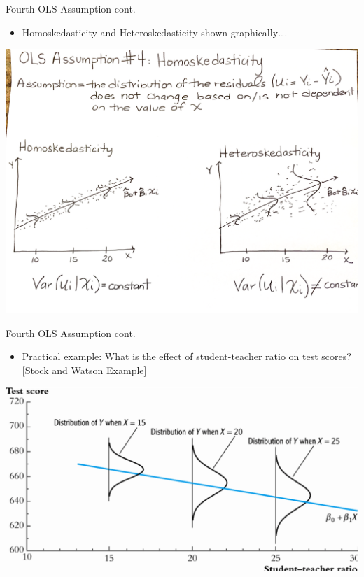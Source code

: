 \documentclass[8pt,ignorenonframetext,dvipsnames]{beamer}
\providecommand{\tightlist}{%
  \setlength{\itemsep}{0pt}\setlength{\parskip}{0pt}}
\let\olditem\item
\renewcommand{\item}{%
  \olditem\vspace{4pt}
}
\begin{document}
\begin{frame}{Fourth OLS Assumption cont.}
\protect\hypertarget{fourth-ols-assumption-cont.}{}

\begin{itemize}
\tightlist
\item
  Homoskedasticity and Heteroskedasticity shown graphically\ldots{}.
\end{itemize}

\includegraphics{heteroskedasticity.png}

\end{frame}

\begin{frame}{Fourth OLS Assumption cont.}
\protect\hypertarget{fourth-ols-assumption-cont.-1}{}

\begin{itemize}
\tightlist
\item
  Practical example: What is the effect of student-teacher ratio on test
  scores? {[}Stock and Watson Example{]}
\end{itemize}

\includegraphics{heteroskedasticity_str.png}

\end{frame}
\end{document}
